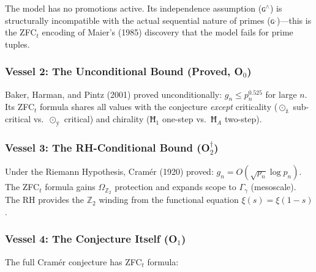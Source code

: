 \documentclass[12pt]{article}
\begin{document}
The model has no promotions active. Its independence assumption
($\text{ɢ}^{\land}$) is structurally incompatible with the actual
sequential nature of primes ($\text{ɢ}^{ˌ}$)---this is the
ZFC${}_t$ encoding of Maier's (1985) discovery that the model
fails for prime tuples.

\subsubsection*{Vessel 2: The Unconditional Bound (Proved, O$_0$)}

Baker, Harman, and Pintz (2001) proved unconditionally:
$g_n \le p_n^{0.525}$ for large $n$. Its ZFC${}_t$ formula
shares all values with the conjecture \emph{except} criticality
($\odot_{\text{ž}}$ sub-critical vs.\ $\odot_{\text{ÿ}}$ critical)
and chirality ($\text{Ħ}_1$ one-step vs.\ $\text{Ħ}_A$ two-step).

\subsubsection*{Vessel 3: The RH-Conditional Bound (O$_2^{\dagger}$)}

Under the Riemann Hypothesis, Cram\'er (1920) proved:
$g_n = O(\sqrt{p_n}\log p_n)$. The ZFC${}_t$ formula gains
$\Omega_{\mathbb{Z}_2}$ protection and expands scope to $\Gamma_{\gamma}$
(mesoscale). The RH provides the $\mathbb{Z}_2$ winding from the
functional equation $\xi(s)=\xi(1-s)$.

\subsubsection*{Vessel 4: The Conjecture Itself (O$_1$)}

The full Cram\'er conjecture has ZFC${}_t$ formula:
\end{document}
